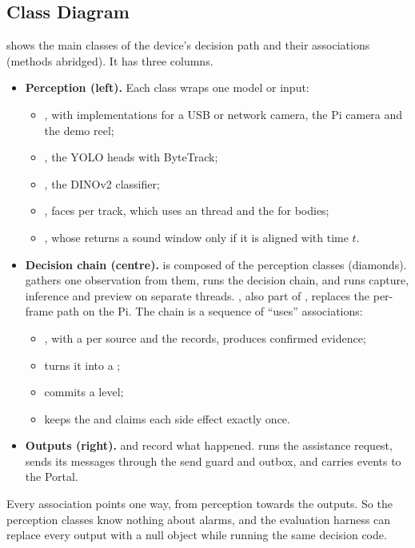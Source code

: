 \subsection{Class Diagram}
 shows the main classes of the device's decision path and their associations (methods abridged). It has three columns.
\begin{itemize}
\item \textbf{Perception (left).} Each class wraps one model or input:
  \begin{itemize}
  \item {}, with implementations for a USB or network camera, the Pi camera and the demo reel;
  \item {}, the YOLO heads with ByteTrack;
  \item {}, the DINOv2 classifier;
  \item {}, faces per track, which uses an  thread and the  for bodies;
  \item {}, whose  returns a sound window only if it is aligned with time $t$.
  \end{itemize}
\item \textbf{Decision chain (centre).}  is composed of the perception classes (diamonds).  gathers one observation from them,  runs the decision chain, and  runs capture, inference and preview on separate threads. , also part of , replaces the per-frame path on the Pi.
  The chain is a sequence of ``uses'' associations:
  \begin{itemize}
  \item {}, with a  per source and the  records, produces confirmed evidence;
  \item {} turns it into a ;
  \item {} commits a level;
  \item {} keeps the  and claims each side effect exactly once.
  \end{itemize}
\item \textbf{Outputs (right).}  and  record what happened.  runs the assistance request,  sends its messages through the send guard and outbox, and  carries events to the Portal.
\end{itemize}
Every association points one way, from perception towards the outputs. So the perception classes know nothing about alarms, and the evaluation harness can replace every output with a null object while running the same decision code.

